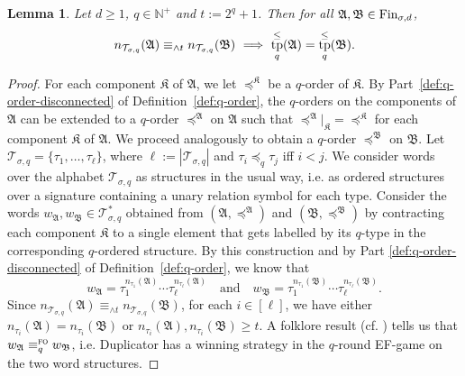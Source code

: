 \documentclass[11pt]{article}
\newtheorem{lemma}[theorem]{Lemma}
\newcommand{\fin}{\textup{Fin}}
\newcommand{\logic}[1]{\textsc{#1}}
\newcommand{\FO}{\logic{fo}}
\newcommand{\eleq}[1][]{\equiv_{#1}}
\newcommand{\foeleq}[1][]{\eleq[#1]^{\FO{}}}
\newcommand{\types}[1][\sigma,q,d]{\mathcal{T}_{#1}}
\newcommand{\maxeq}[1]{\equiv_{{\wedge}#1}}
\newcommand{\leqsym}{\logic{\ensuremath{\leq}}}
\newcommand{\rela}[2]{\ensuremath{{#1|}_{#2}}}
\newcommand{\relao}[2]{\rela{#1\!}{#2}}
\DeclareMathOperator{\tp}{tp}
\newcommand{\struct}[1]{\mathfrak{#1}}
\newcommand{\AS}{\struct{A}}
\newcommand{\BS}{\struct{B}}
\newcommand{\KS}{\struct{K}}
\newcommand{\set}[1]{\{#1\}}
\newcommand{\Npos}{\mathbb{N}^{+}}
\begin{document}
\begin{lemma}
  \label{lem:cut-determines-type}
  Let $d \geq 1$, $q\in \Npos$ and $t:=2^q+1$. Then for all $\AS,\BS\in
  \fin_{\sigma,d}$, 
  \[ n_{\types[\sigma,q]}(\AS) \maxeq{t} n_{\types[\sigma,q]}(\BS) \ \Longrightarrow \ 
  \tp^\leqsym_q(\AS)=\tp^\leqsym_q(\BS).
  \]
\end{lemma}
\begin{proof}
  For each component $\KS$ of $\AS$, we let $\preceq^\KS$ be a
  $q$-order of $\KS$.
  By Part~\ref{def:q-order-disconnected} of Definition~\ref{def:q-order},
  the $q$-orders on the components of $\AS$ can be extended to a $q$-order
  $\preceq^\AS$ on $\AS$ such that
  $\relao{\preceq^\AS}{\KS}=\preceq^\KS$ for each component $\KS$ of
  $\AS$. We proceed analogously to obtain a $q$-order $\preceq^\BS$ on
  $\BS$.  Let $\types[\sigma,q]=\set{\tau_{1}, \ldots, \tau_{\ell}}$,
  where $\ell:=|\types[\sigma,q]|$ and $\tau_{i} \preceq_{q} \tau_{j}$
  iff $i<j$.
  We consider words over the alphabet $\types[\sigma,q]$ as structures in the usual way,
  i.e. as ordered structures over a signature containing a unary relation symbol for each type.
  Consider the words $w_{\AS},w_{\BS}\in\types[\sigma,q]^{*}$ obtained from $(\AS,\preceq^\AS)$ and
  $(\BS,\preceq^\BS)$ by contracting each component $\KS$ to a single
  element that gets labelled by its $q$-type in the corresponding
  $q$-ordered structure.
  By this construction and by Part \ref{def:q-order-disconnected} of
  Definition~\ref{def:q-order}, we know that 
  \[
  w_{\AS}=\tau_{1}^{n_{\tau_{1}}(\AS)} \dotsb
  \tau_{\ell}^{n_{\tau_{\ell}}(\AS)} \quad \text{and} \quad
  w_{\BS}=\tau_{1}^{n_{\tau_{1}}(\BS)} \dotsb
  \tau_{\ell}^{n_{\tau_{\ell}}(\BS)}.
  \]
  Since $n_{\types[\sigma,q]}(\AS) \maxeq{t}
  n_{\types[\sigma,q]}(\BS)$, for each $i\in [\ell]$, we have either
  $n_{\tau_{i}}(\AS) = n_{\tau_{i}}(\BS)$ or
  $n_{\tau_{i}}(\AS),n_{\tau_{i}}(\BS) \geq t$. A folklore result
  (cf. \cite[Ch. 3]{Libkin2004}) tells us that $w_{\AS} \foeleq[q]
  w_{\BS}$, i.e. Duplicator has a winning strategy in the $q$-round
  EF-game on the two word structures.


\end{proof}
\end{document}
